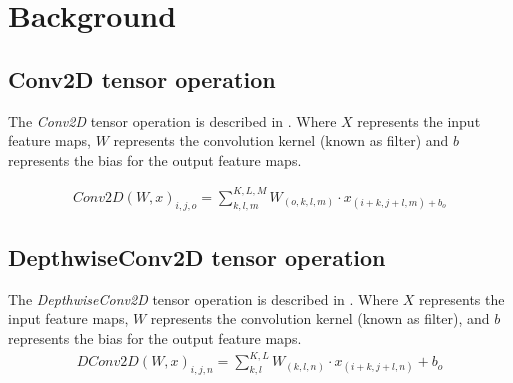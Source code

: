 \section{Background}
\label{sec:background}
\subsection{Conv2D tensor operation}
The \emph{Conv2D} tensor operation is described in . Where $X$ represents the input feature maps, $W$ represents the convolution kernel (known as filter) and $b$ represents the bias for the output feature maps\cite{goodfellow2016deep}.

 	\begin{eqnarray} \label{eq:conv2D}
 	Conv2D\left(W,x\right)_{i,j,o}=\sum_{k,l,m}^{K,L,M}W_{(o,k,l,m)} \cdot x_{(i+k,j+l,m)+b_{o}}
 	\end{eqnarray} 	
 	
\subsection{DepthwiseConv2D tensor operation}
The \emph{DepthwiseConv2D} tensor operation is described in . Where $X$ represents the input feature maps, $W$ represents the convolution kernel (known as filter), and $b$ represents the bias for the output feature maps.
 	\begin{eqnarray} \label{eq:dconv2D}
 	DConv2D\left(W,x\right)_{i,j,n}=\sum_{k,l}^{K,L}W_{(k,l,n)} \cdot x_{(i+k,j+l,n)}+b_{o}
 	\end{eqnarray}